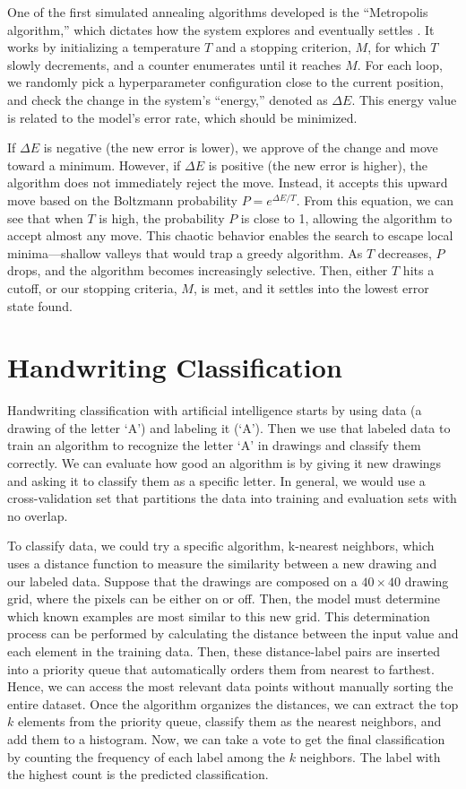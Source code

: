 \documentclass[stu,12pt,floatsintext]{apa7}
\begin{document}
One of the first simulated annealing algorithms developed is the ``Metropolis algorithm,'' which dictates how the system explores and eventually settles \parencite{rutenbar2002simulated}. It works by initializing a temperature \(T\) and a stopping criterion, \(M\), for which \(T\) slowly decrements, and a counter enumerates until it reaches \(M\). For each loop, we randomly pick a hyperparameter configuration close to the current position, and check the change in the system's ``energy,'' denoted as \(\Delta E\). This energy value is related to the model's error rate, which should be minimized.

If \(\Delta E\) is negative (the new error is lower), we approve of the change and move toward a minimum. However, if \(\Delta E\) is positive (the new error is higher), the algorithm does not immediately reject the move. Instead, it accepts this upward move based on the Boltzmann probability \(P = e^{\Delta E/T}\). From this equation, we can see that when \(T\) is high, the probability \(P\) is close to 1, allowing the algorithm to accept almost any move. This chaotic behavior enables the search to escape local minima—shallow valleys that would trap a greedy algorithm. As \(T\) decreases, \(P\) drops, and the algorithm becomes increasingly selective. Then, either \(T\) hits a cutoff, or our stopping criteria, \(M\), is met, and it settles into the lowest error state found.

\section{Handwriting Classification}

Handwriting classification with artificial intelligence starts by using data (a drawing of the letter `A') and labeling it (`A'). Then we use that labeled data to train an algorithm to recognize the letter `A' in drawings and classify them correctly. We can evaluate how good an algorithm is by giving it new drawings and asking it to classify them as a specific letter. In general, we would use a cross-validation set that partitions the data into training and evaluation sets with no overlap.

To classify data, we could try a specific algorithm, k-nearest neighbors, which uses a distance function to measure the similarity between a new drawing and our labeled data. Suppose that the drawings are composed on a \(40 \times 40\) drawing grid, where the pixels can be either on or off. Then, the model must determine which known examples are most similar to this new grid. This determination process can be performed by calculating the distance between the input value and each element in the training data. Then, these distance-label pairs are inserted into a priority queue that automatically orders them from nearest to farthest. Hence, we can access the most relevant data points without manually sorting the entire dataset. Once the algorithm organizes the distances, we can extract the top \(k\) elements from the priority queue, classify them as the nearest neighbors, and add them to a histogram. Now, we can take a vote to get the final classification by counting the frequency of each label among the \(k\) neighbors. The label with the highest count is the predicted classification. 
\end{document}

